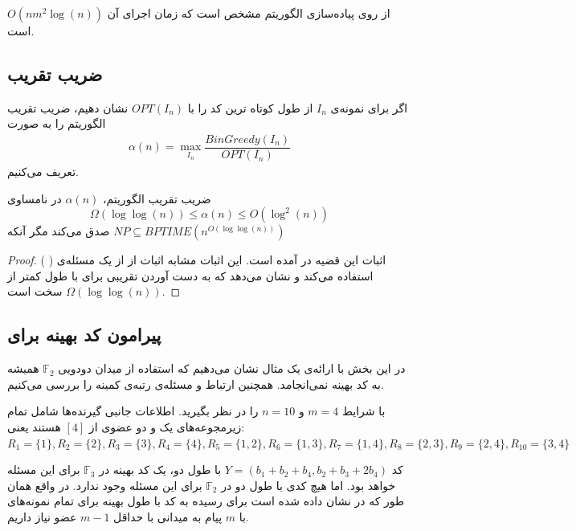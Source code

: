 از روی پیاده‌سازی الگوریتم مشخص است که زمان اجرای آن
$O(nm^2 \log(n))$
است.
\subsection{
ضریب تقریب
}
\begin{definition}
اگر برای نمونه‌ی
$I_n$
از 
\picod
طول کوتاه ترین کد را با
$OPT(I_n)$
نشان دهیم، ضریب تقریب الگوریتم را به صورت
 \begin{align}
 	\alpha(n) = \max\limits_{I_n} \dfrac{BinGreedy(I_n)}{OPT(I_n)}
 \end{align}
تعریف می‌کنیم.
\end{definition}


\begin{theorem}
	\label{theorem:pliable2016:theorem2}
	ضریب تقریب الگوریتم،
	$\alpha(n)$
	در نامساوی
	$$\Omega(\log \log (n)) \leq \alpha(n) \leq O(\log^2(n))$$
	صدق می‌کند مگر آنکه
	$NP \subseteq BPTIME(n^{O(\log \log (n))})$
\end{theorem}
\begin{proof}
	اثبات این قضیه در
	\cite{song2016deterministic}
	آمده است. این اثبات مشابه اثبات
	\cite{ELKIN20048}
	از 
	از یک مسئله‌ی 
	\nphard
	(
	) استفاده می‌کند و نشان می‌دهد که به دست آوردن تقریبی برای
	\picod
	با طول کمتر از
	$\Omega(\log \log (n))$
	سخت است.
\end{proof}

\subsection{
پیرامون کد بهینه برای
\picod
}
در این بخش با ارائه‌ی یک مثال نشان می‌دهیم که استفاده از میدان دودویی
$\mathbb{F}_2$
همیشه به کد بهینه نمی‌انجامد. همچنین ارتباط
\picod
و مسئله‌ی رتبه‌ی کمینه را بررسی می‌کنیم.
\begin{example}
	\picod
	با شرایط
	$m = 4$
	و
	$n = 10$
	را در نظر بگیرید. اطلاعات جانبی گیرنده‌ها شامل تمام زیرمجوعه‌های یک و دو عضوی از
	$[4]$
	هستند یعنی:
	$R_1 = \{1\}, R_2 = \{2\}, R_3 = \{3\}, R_4 = \{4\}, R_5 = \{1, 2\}, R_6 = \{1, 3\}, R_7 = \{1, 4\}, R_8 = \{2, 3\}, R_9 = \{2, 4\}, R_{10} = \{3, 4\}$
	
	کد
	$Y = (b_1 + b_2 + b_4, b_2+b_3+2b_4)$
	با طول دو، یک کد بهینه در
	$\mathbb{F}_3$
	برای این مسئله خواهد بود. اما هیچ کدی با طول دو در
	$\mathbb{F}_2$
	برای این مسئله وجود ندارد. در واقع همان طور که در
	\cite{song2016deterministic}
	نشان داده شده است برای رسیده به کد با طول بهینه برای تمام نمونه‌های با
	$m$
	پیام به میدانی با حداقل
	$m - 1$
	عضو نیاز داریم.
\end{example}

